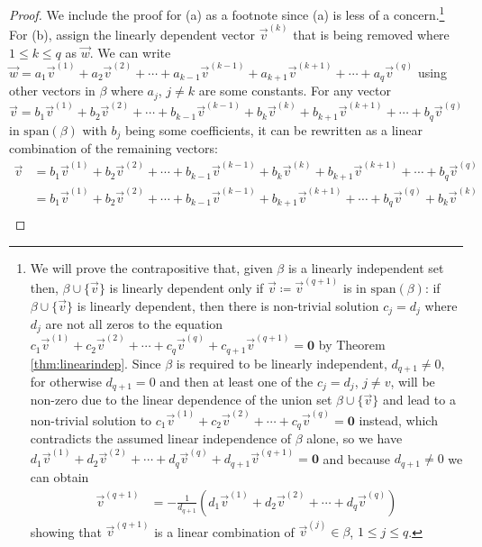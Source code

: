 \begin{proof}
We include the proof for (a) as a footnote since (a) is less of a concern.\footnote{We will prove the contrapositive that, given $\mathcal{\beta}$ is a linearly independent set then, $\mathcal{\beta} \cup \{\vec{v}\}$ is linearly dependent only if $\vec{v} \coloneq \vec{v}^{(q+1)}$ is in $\text{span}(\mathcal{\beta})$: if $\mathcal{\beta} \cup \{\vec{v}\}$ is linearly dependent, then there is non-trivial solution $c_j = d_j$ where $d_j$ are not all zeros to the equation $c_1\vec{v}^{(1)} + c_2\vec{v}^{(2)} + \cdots + c_q\vec{v}^{(q)} + c_{q+1}\vec{v}^{(q+1)} = \textbf{0}$ by Theorem \ref{thm:linearindep}. Since $\mathcal{\beta}$ is required to be linearly independent, $d_{q+1} \neq 0$, for otherwise $d_{q+1} = 0$ and then at least one of the $c_j = d_j$, $j \neq v$, will be non-zero due to the linear dependence of the union set $\mathcal{\beta} \cup \{\vec{v}\}$ and lead to a non-trivial solution to $c_1\vec{v}^{(1)} + c_2\vec{v}^{(2)} + \cdots + c_q\vec{v}^{(q)} = \textbf{0}$ instead, which contradicts the assumed linear independence of $\mathcal{\beta}$ alone, so we have $d_1\vec{v}^{(1)} + d_2\vec{v}^{(2)} + \cdots + d_q\vec{v}^{(q)} + d_{q+1}\vec{v}^{(q+1)} = \textbf{0}$ and because $d_{q+1} \neq 0$ we can obtain
\begin{align*}
\vec{v}^{(q+1)} &= -\frac{1}{d_{q+1}}(d_1\vec{v}^{(1)} + d_2\vec{v}^{(2)} + \cdots + d_q\vec{v}^{(q)})
\end{align*}
showing that $\vec{v}^{(q+1)}$ is a linear combination of $\vec{v}^{(j)} \in \mathcal{\beta}$, $1 \leq j \leq q$.} For (b), assign the linearly dependent vector $\vec{v}^{(k)}$ that is being removed where $1 \leq k \leq q$ as $\vec{w}$. We can write $\vec{w} = a_1\vec{v}^{(1)} + a_2\vec{v}^{(2)} + \cdots + a_{k-1}\vec{v}^{(k-1)} + a_{k+1}\vec{v}^{(k+1)} + \cdots + a_q\vec{v}^{(q)}$ using other vectors in $\mathcal{\beta}$ where $a_j$, $j \neq k$ are some constants. For any vector $\vec{v} = b_1\vec{v}^{(1)} + b_2\vec{v}^{(2)} + \cdots + b_{k-1}\vec{v}^{(k-1)} + b_k\vec{v}^{(k)} + b_{k+1}\vec{v}^{(k+1)} + \cdots + b_q\vec{v}^{(q)}$ in $\text{span}(\mathcal{\beta})$ with $b_j$ being some coefficients, it can be rewritten as a linear combination of the remaining vectors:
\begin{align*}
\vec{v} &= b_1\vec{v}^{(1)} + b_2\vec{v}^{(2)} + \cdots + b_{k-1}\vec{v}^{(k-1)} + b_k\vec{v}^{(k)} + b_{k+1}\vec{v}^{(k+1)} + \cdots + b_q\vec{v}^{(q)} \\
&= b_1\vec{v}^{(1)} + b_2\vec{v}^{(2)} + \cdots + b_{k-1}\vec{v}^{(k-1)} + b_{k+1}\vec{v}^{(k+1)} + \cdots + b_q\vec{v}^{(q)} + b_k\vec{v}^{(k)} \\

\end{align*}
\end{proof}
